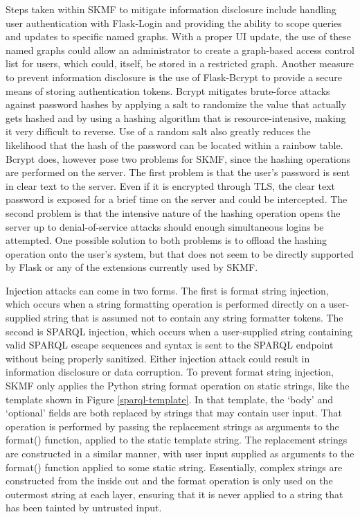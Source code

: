 Steps taken within SKMF to mitigate information disclosure include handling user authentication with Flask-Login and providing the ability to scope queries and updates to specific named graphs. With a proper UI update, the use of these named graphs could allow an administrator to create a graph-based access control list for users, which could, itself, be stored in a restricted graph. Another measure to prevent information disclosure is the use of Flask-Bcrypt to provide a secure means of storing authentication tokens. Bcrypt mitigates brute-force attacks against password hashes by applying a salt to randomize the value that actually gets hashed and by using a hashing algorithm that is resource-intensive, making it very difficult to reverse. Use of a random salt also greatly reduces the likelihood that the hash of the password can be located within a rainbow table. Bcrypt does, however pose two problems for SKMF, since the hashing operations are performed on the server. The first problem is that the user's password is sent in clear text to the server. Even if it is encrypted through TLS, the clear text password is exposed for a brief time on the server and could be intercepted. The second problem is that the intensive nature of the hashing operation opens the server up to denial-of-service attacks should enough simultaneous logins be attempted. One possible solution to both problems is to offload the hashing operation onto the user's system, but that does not seem to be directly supported by Flask or any of the extensions currently used by SKMF.

Injection attacks can come in two forms. The first is format string injection, which occurs when a string formatting operation is performed directly on a user-supplied string that is assumed not to contain any string formatter tokens. The second is SPARQL injection, which occurs when a user-supplied string containing valid SPARQL escape sequences and syntax is sent to the SPARQL endpoint without being properly sanitized. Either injection attack could result in information disclosure or data corruption. To prevent format string injection, SKMF only applies the Python string format operation on static strings, like the template shown in Figure
\ref{sparql-template}.
In that template, the `body' and `optional' fields are both replaced by strings that may contain user input. That operation is performed by passing the replacement strings as arguments to the format() function, applied to the static template string. The replacement strings are constructed in a similar manner, with user input supplied as arguments to the format() function applied to some static string. Essentially, complex strings are constructed from the inside out and the format operation is only used on the outermost string at each layer, ensuring that it is never applied to a string that has been tainted by untrusted input.

